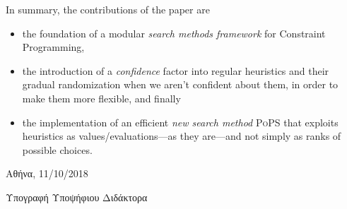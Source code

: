 \documentclass[a4paper]{article}
\begin{document}
In summary, the contributions of the paper are
\begin{itemize}
  \item the foundation of a modular \emph{search methods
        framework} for Constraint Programming,
  \item the introduction of a \emph{confidence} factor into
        regular heuristics and their gradual randomization
        when we aren't confident about them, in order to
        make them more flexible, and finally
  \item the implementation of an efficient \emph{new search
        method} \textsc{PoPS} that exploits heuristics as
        values\slash evaluations---as they are---and not
        simply as ranks of possible choices.
\end{itemize}




\vspace{1em}

\begin{center}
  Αθήνα, 11/10/2018

  \vspace{4em}

  Υπογραφή Υποψήφιου Διδάκτορα
\end{center}
\end{document}
